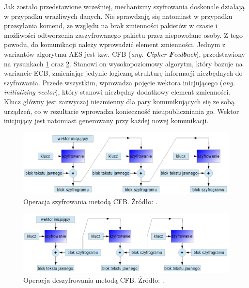 Jak zostało przedstawione wcześniej, mechanizmy szyfrowania doskonale działają w przypadku wrażliwych danych. Nie sprawdzają się natomiast w przypadku przesyłania komend, ze względu na brak zmienności pakietów w czasie i możliwości odtworzenia zaszyfrowanego pakietu przez niepowołane osoby. Z tego powodu, do komunikacji należy wprowadzić element zmienności.
Jednym z wariantów algorytmu AES jest tzw. CFB (\textit{ang. \textbf{C}ipher \textbf{F}eed\textbf{b}ack}), przedstawiony na rysunkach \ref{fig:image_cfb_encrypt} oraz \ref{fig:image_cfb_decrypt}. Stanowi on wysokopoziomowy algorytm, który bazuje na wariancie ECB, zmieniając jedynie logiczną strukturę informacji niezbędnych do szyfrowania. Przede wszystkim, wprowadza pojęcie wektora inicjującego (\textit{ang. initializing vector}), który stanowi niezbędny dodatkowy element zmienności. Klucz główny jest zazwyczaj niezmienny dla pary komunikujących się ze sobą urządzeń, co w rezultacie wprowadza konieczność nieupubliczniania go. Wektor inicjujący jest natomiast generowany przy każdej nowej komunikacji. 

	\begin{figure}[h]
		\centering
		\includegraphics[width=15cm]{img/com_security/CFB_szyfrowanie.png}
		\caption{Operacja szyfrowania metodą CFB. Źródło: \cite{aes_cryptoit}.}
		\label{fig:image_cfb_encrypt}
	\end{figure}
	
	\begin{figure}[h]
		\centering
		\includegraphics[width=15cm]{img/com_security/CFB_deszyfrowanie.png}
		\caption{Operacja deszyfrowania metodą CFB. Źródło: \cite{aes_cryptoit}.}
		\label{fig:image_cfb_decrypt}
	\end{figure}
	


